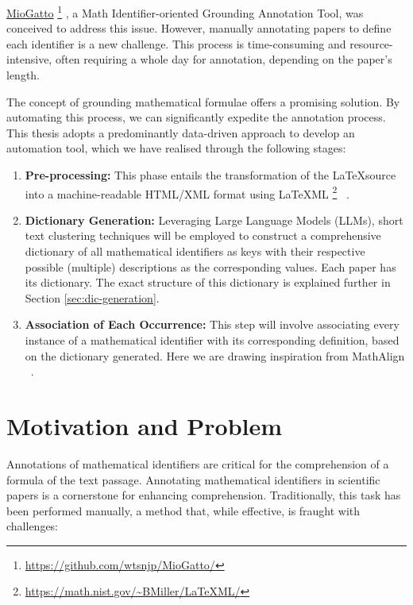 \href{https://github.com/wtsnjp/MioGatto/tree/main}{MioGatto} \footnote{\url{https://github.com/wtsnjp/MioGatto/}} \citep{asakura2021miogatto}, a Math Identifier-oriented Grounding Annotation Tool, was conceived to address this issue. However, manually annotating papers to define each identifier is a new challenge. This process is time-consuming and resource-intensive, often requiring a whole day for annotation, depending on the paper's length.

The concept of grounding mathematical formulae \citep{asakura2020towards} offers a promising solution. By automating this process, we can significantly expedite the annotation process. This thesis adopts a predominantly data-driven approach to develop an automation tool, which we have realised through the following stages:

\begin{enumerate}
    \item \textbf{Pre-processing:} This phase entails the transformation of the \LaTeX \space source into a machine-readable HTML/XML format using \LaTeX ML \footnote{\url{https://math.nist.gov/~BMiller/LaTeXML/}} ~\citep{ginev2011latexml}.
    
    \item \textbf{Dictionary Generation:} Leveraging Large Language Models (\ac{LLMs}), short text clustering techniques will be employed to construct a comprehensive dictionary of all mathematical identifiers as keys with their respective possible (multiple) descriptions as the corresponding values. Each paper has its dictionary. The exact structure of this dictionary is explained further in Section \ref{sec:dic-generation}.
    
    \item \textbf{Association of Each Occurrence:} This step will involve associating every instance of a mathematical identifier with its corresponding definition, based on the dictionary generated. Here we are drawing inspiration from MathAlign ~\citep{alexeeva2020mathalign}.
\end{enumerate}


\section{Motivation and Problem}

Annotations of mathematical identifiers are critical for the comprehension of a formula of the text passage. Annotating mathematical identifiers in scientific papers is a cornerstone for enhancing comprehension. Traditionally, this task has been performed manually, a method that, while effective, is fraught with challenges:

